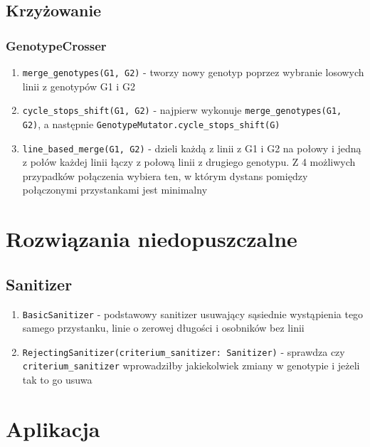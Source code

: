 \documentclass[12pt,a4paper]{article}
\begin{document}
\subsection{Krzyżowanie}

\subsubsection{GenotypeCrosser}

\begin{enumerate}
    \item \lstinline{merge_genotypes(G1, G2)} - tworzy nowy genotyp poprzez wybranie losowych linii z genotypów G1 i G2
    \item \lstinline{cycle_stops_shift(G1, G2)} - najpierw wykonuje \lstinline{merge_genotypes(G1, G2)}, a następnie \lstinline{GenotypeMutator.cycle_stops_shift(G)}
    \item \lstinline{line_based_merge(G1, G2)} - dzieli każdą z linii z G1 i G2 na połowy i jedną z połów każdej linii łączy z połową linii z drugiego genotypu. Z 4 możliwych przypadków połączenia wybiera ten, w którym dystans pomiędzy połączonymi przystankami jest minimalny
\end{enumerate}

\section{Rozwiązania niedopuszczalne}

\subsection{Sanitizer}

\begin{enumerate}
    \item \lstinline{BasicSanitizer} - podstawowy sanitizer usuwający sąsiednie wystąpienia tego samego przystanku, linie o zerowej długości i osobników bez linii
    \item \lstinline{RejectingSanitizer(criterium_sanitizer: Sanitizer)} - sprawdza czy \lstinline{criterium_sanitizer} wprowadziłby jakiekolwiek zmiany w genotypie i jeżeli tak to go usuwa
\end{enumerate}

\section{Aplikacja}
\end{document}
